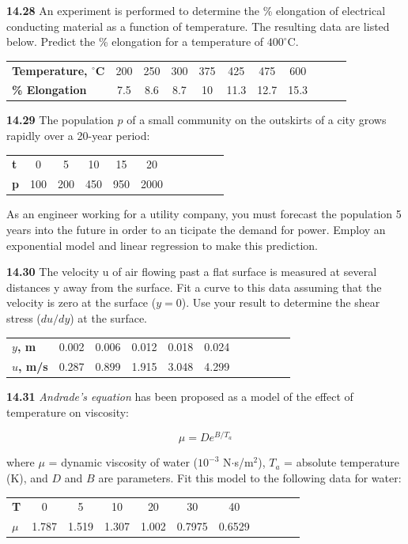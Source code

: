 \documentclass[../main.tex]{subfiles}
\begin{document}
\begin{multicols}{2}
	\noindent\textbf{14.28} An experiment is performed to determine the \% elongation of electrical conducting material as a function of temperature. The resulting data are listed below. Predict the \%
	elongation for a temperature of $400^\circ$C.

	\noindent \begin{tabular}{l c c c c c c c c c c}
		\textbf{Temperature, $^\circ$C} & 200 & 250 & 300 & 375 & 425 & 475 & 600 \\
		\textbf{\% Elongation} & 7.5 & 8.6 & 8.7 & 10 & 11.3 & 12.7 & 15.3
	\end{tabular}

	\noindent\textbf{14.29} The population $p$ of a small community on the outskirts of a city grows rapidly over a 20-year period:

	\noindent \begin{tabular}{l c c c c c c c c c c}
		\textbf{t} & 0 & 5 & 10 & 15 & 20 \\
		\textbf{p} & 100 & 200 & 450 & 950 & 2000
	\end{tabular}

	\noindent As an engineer working for a utility company, you must
	forecast the population 5 years into the future in order to an	ticipate the demand for power. Employ an exponential
	model and linear regression to make this prediction.

	\noindent\textbf{14.30} The velocity u of air flowing past a flat surface is
	measured at several distances y away from the surface. Fit a
	curve to this data assuming that the velocity is zero at the
	surface ($y = 0$). Use your result to determine the shear stress
	($du/dy$) at the surface.

	\noindent \begin{tabular}{l c c c c c c c c c c}
		\textbf{$y$, m} & 0.002 & 0.006 & 0.012 & 0.018 & 0.024 \\
		\textbf{$u$, m/s} & 0.287 & 0.899 & 1.915 & 3.048 & 4.299
	\end{tabular}

	\noindent\textbf{14.31} \textit{Andrade's equation} has been proposed as a model of the effect of temperature on viscosity:

	$$ \mu = De^{B/T_a}$$

	\noindent where $\mu$ = dynamic viscosity of water ($10^{-3}$ N$\cdot$s/m$^2$), $T_a$ = absolute temperature (K), and $D$ and $B$ are parameters. Fit this model to the following data for water:

	\noindent \begin{tabular}{l c c c c c c c c c c}
		\textbf{T} & 0 & 5 & 10 & 20 & 30 & 40 \\
		\textbf{$\mu$} & 1.787 & 1.519 & 1.307 & 1.002 & 0.7975 & 0.6529
	\end{tabular}


\end{multicols}
\end{document}
